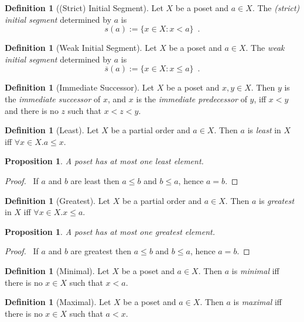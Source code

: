 \documentclass{report}
\let\qed\relax
\newtheorem{prop}[ax]{Proposition}
\theoremstyle{definition}
\newtheorem{df}[ax]{Definition}
\begin{document}
\begin{df}[(Strict) Initial Segment]
Let $X$ be a poset and $a \in X$. The \emph{(strict) initial segment} determined by $a$ is
\[ s(a) := \{ x \in X : x < a \} \enspace . \]
\end{df}

\begin{df}[Weak Initial Segment]
Let $X$ be a poset and $a \in X$. The \emph{weak initial segment} determined by $a$ is
\[ \overline{s}(a) := \{ x \in X : x \leq a \} \enspace . \]
\end{df}

\begin{df}[Immediate Successor]
Let $X$ be a poset and $x,y \in X$. Then $y$ is the \emph{immediate successor} of $x$, and $x$ is the \emph{immediate predecessor} of $y$, iff $x < y$ and there is no $z$ such that $x < z < y$.
\end{df}

\begin{df}[Least]
Let $X$ be a partial order and $a \in X$. Then $a$ is \emph{least} in $X$ iff $\forall x \in X. a \leq x$.
\end{df}

\begin{prop}
A poset has at most one least element.
\end{prop}

\begin{proof}
\pf\ If $a$ and $b$ are least then $a \leq b$ and $b \leq a$, hence $a = b$. \qed
\end{proof}

\begin{df}[Greatest]
Let $X$ be a partial order and $a \in X$. Then $a$ is \emph{greatest} in $X$ iff $\forall x \in X. x \leq a$.
\end{df}

\begin{prop}
A poset has at most one greatest element.
\end{prop}

\begin{proof}
\pf\ If $a$ and $b$ are greatest then $a \leq b$ and $b \leq a$, hence $a = b$. \qed
\end{proof}

\begin{df}[Minimal]
Let $X$ be a poset and $a \in X$. Then $a$ is \emph{minimal} iff there is no $x \in X$ such that $x < a$.
\end{df}

\begin{df}[Maximal]
Let $X$ be a poset and $a \in X$. Then $a$ is \emph{maximal} iff there is no $x \in X$ such that $a < x$.
\end{df}
\end{document}
